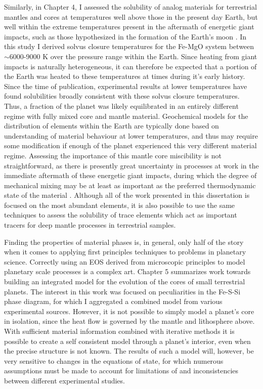 Similarly, in Chapter 4, I assessed the solubility of analog materials for
terrestrial mantles and cores at temperatures well above those in the present day
Earth, but well within the extreme temperatures present in the aftermath of energetic
giant impacts, such as those hypothesized in the formation of the Earth's moon
\citep{Cuk2012,Canup2012}. In this study I derived solvus closure temperatures for
the Fe-MgO system between $\sim$6000-9000 K over the pressure range within the Earth.
Since heating from giant impacts is naturally heterogeneous, it can therefore be
expected that a portion of the Earth was heated to these temperatures at times during
it's early history. Since the time of publication, experimental results at lower
temperatures \citep{Badro2016} have found solubilities broadly consistent with these
solvus closure temperatures. Thus, a fraction of the planet was likely equilibrated
in an entirely different regime with fully mixed core and mantle material.
Geochemical models for the distribution of elements within the Earth are typically
done based on understanding of material behaviour at lower temperatures, and thus may
require some modification if enough of the planet experienced this very different
material regime.  Assessing the importance of this mantle core miscibility is not
straightforward, as there is presently great uncertainty in processes at work in the
immediate aftermath of these energetic giant impacts, during which the degree of
mechanical mixing may be at least as important as the preferred thermodynamic state
of the material \citep{Nakajima2014,Deguen2014}. Although all of the work presented
in this dissertation is focused on the most abundant elements, it is also possible to
use the same techniques to assess the solubility of trace elements which act as
important tracers for deep mantle processes in terrestrial samples.

Finding the properties of material phases is, in general, only half of the
story when it comes to applying first principles techniques to problems in planetary
science. Correctly using an EOS derived from microscopic principles to model
planetary scale processes is a complex art. Chapter 5 summarizes work towards
building an integrated model for the evolution of the cores of small terrestrial
planets. The interest in this work was focused on peculiarities in the Fe-S-Si phase
diagram, for which I aggregated a combined model from various experimental sources.
However, it is not possible to simply model a planet's core in isolation, since the
heat flow is governed by the mantle and lithosphere above. With sufficient material
information combined with iterative methods it is possible to create a self
consistent model through a planet's interior, even when the precise structure is not
known. The results of such a model will, however, be very sensitive to changes in the
equations of state, for which numerous assumptions must be made to account for
limitations of and inconsistencies between different experimental studies.

